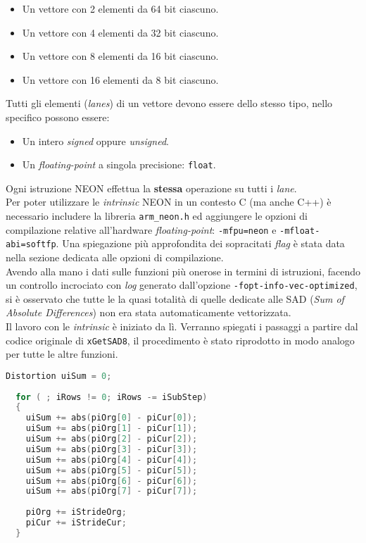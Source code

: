 \begin{itemize}
  \item Un vettore con 2 elementi da 64 bit ciascuno.
  \item Un vettore con 4 elementi da 32 bit ciascuno.
  \item Un vettore con 8 elementi da 16 bit ciascuno.
  \item Un vettore con 16 elementi da 8 bit ciascuno.
\end{itemize}

Tutti gli elementi (\emph{lanes}) di un vettore devono essere dello stesso 
tipo, nello specifico possono essere:

\begin{itemize}
  \item Un intero \emph{signed} oppure \emph{unsigned}.
  \item Un \emph{floating-point} a singola precisione: \verb|float|.
\end{itemize}

Ogni istruzione NEON effettua la \textbf{stessa} operazione su tutti i 
\emph{lane}.\\

Per poter utilizzare le \emph{intrinsic} NEON in un contesto C (ma anche C++) è 
necessario includere la libreria \verb|arm_neon.h| ed aggiungere le opzioni di 
compilazione relative all'hardware \emph{floating-point}: \verb|-mfpu=neon| e 
\verb|-mfloat-abi=softfp|. Una spiegazione più approfondita dei sopracitati 
\emph{flag} è stata data nella sezione dedicata alle opzioni di compilazione.\\

Avendo alla mano i dati sulle funzioni più onerose in termini di istruzioni, 
facendo un controllo incrociato con \emph{log} generato dall'opzione 
\verb|-fopt-info-vec-optimized|, si è osservato che tutte le la quasi totalità 
di quelle dedicate alle SAD (\emph{Sum of Absolute Differences}) non era stata 
automaticamente vettorizzata.\\

Il lavoro con le \emph{intrinsic} è iniziato da lì. Verranno spiegati i 
passaggi a partire dal codice originale di \verb|xGetSAD8|, il procedimento è 
stato riprodotto in modo analogo per tutte le altre funzioni.\\

\begin{lstlisting}[language=C]
  Distortion uiSum = 0;
  
  for ( ; iRows != 0; iRows -= iSubStep)
  {
    uiSum += abs(piOrg[0] - piCur[0]);
    uiSum += abs(piOrg[1] - piCur[1]);
    uiSum += abs(piOrg[2] - piCur[2]);
    uiSum += abs(piOrg[3] - piCur[3]);
    uiSum += abs(piOrg[4] - piCur[4]);
    uiSum += abs(piOrg[5] - piCur[5]);
    uiSum += abs(piOrg[6] - piCur[6]);
    uiSum += abs(piOrg[7] - piCur[7]);
    
    piOrg += iStrideOrg;
    piCur += iStrideCur;
  }
\end{lstlisting}

